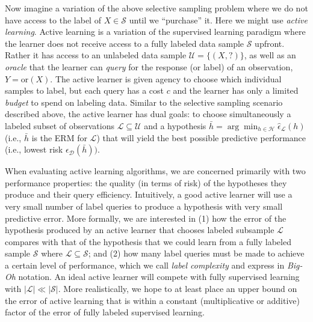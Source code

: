 Now imagine a variation of the above selective sampling problem where we do not have access to the label of $X \in \mathcal{S}$ until we ``purchase'' it. Here we might use \textit{active learning}. Active learning is a variation of the supervised learning paradigm where the learner does not receive access to a fully labeled data sample $\mathcal{S}$ upfront. Rather it has access to an unlabeled data sample $\mathcal{U} = \{(X, ?)\}$, as well as an \textit{oracle} that the learner can \textit{query} for the response (or label) of an observation, $Y = \mathrm{or}(X)$. The active learner is given agency to choose which individual samples to label, but each query has a cost $c$ and the learner has only a limited \textit{budget} to spend on labeling data. Similar to the selective sampling scenario described above, the active learner has dual goals: to choose simultaneously a labeled subset of observations $\mathcal{L} \subseteq \mathcal{U}$ and a hypothesis $\bar{h} = \arg\min_{h \in \mathcal{H}} \hat{\epsilon}_{\mathcal{L}}(h)$ (i.e., $\bar{h}$ is the ERM for $\mathcal{L}$) that will yield the best possible predictive performance (i.e., lowest risk $\epsilon_{\mathcal{D}}(\bar{h}))$.

When evaluating active learning algorithms, we are concerned primarily with two performance properties: the quality (in terms of risk) of the hypotheses they produce and their query efficiency. Intuitively, a good active learner will use a very small number of label queries to produce a hypothesis with very small predictive error. More formally, we are interested in (1) how the error of the hypothesis produced by an active learner that chooses labeled subsample $\mathcal{L}$ compares with that of the hypothesis that we could learn from a fully labeled sample $\mathcal{S}$ where $\mathcal{L} \subseteq \mathcal{S}$; and (2) how many label queries must be made to achieve a certain level of performance, which we call \textit{label complexity} and express in \textit{Big-Oh} notation. An ideal active learner will compete with fully supervised learning with $|\mathcal{L}| \ll |\mathcal{S}|$. More realistically, we hope to at least place an upper bound on the error of active learning that is within a constant (multiplicative or additive) factor of the error of fully labeled supervised learning.

